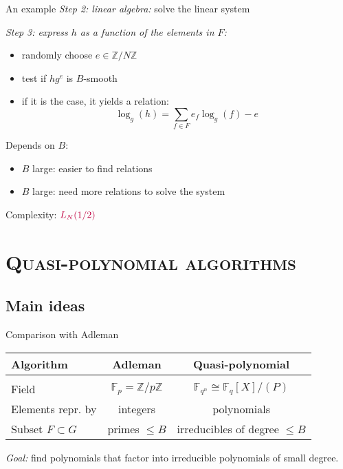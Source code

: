 \documentclass[xcolor=x11names,compress]{beamer}
\theoremstyle{break}
\theoremstyle{sc}
\theoremstyle{definition}
\theoremstyle{remark}
\begin{document}
\begin{frame}{An example}
  \emph{Step 2: linear algebra:} solve the linear system
  
  \emph{Step 3: express $h$ as a function of the elements in $F$:}
  \begin{itemize}
     \item randomly choose $e\in \mathbb{Z}/N\mathbb{Z}$
    \item test if $hg^e$ is $B$-smooth
    \item if it is the case, it yields a relation:
     \[
      \log_g(h) = \sum_{f\in F}e_f\log_g(f) - e
      \]
  \end{itemize}

 Depends on $B$:
  \begin{itemize}
    \item $B$ large: easier to find relations
    \item $B$ large: need more relations to solve the system
  \end{itemize}
  Complexity: $\textcolor{purple}{L_N(1/2)}$

\end{frame}

\section{\scshape Quasi-polynomial algorithms} 
\subsection{Main ideas}
\begin{frame}{Comparison with Adleman}
  \begin{center}
  \begin{tabular}[here]{lcc}
  Algorithm  & Adleman & Quasi-polynomial \\
  \hline
  & & \\
  Field & $\mathbb{F}_p=\mathbb{Z}/p\mathbb{Z}$ & $\mathbb{F}_{q^n}\cong \mathbb{F}_q[X]/(P)$ \\
  Elements repr. by & integers & polynomials \\
  Subset $F\subset G$ & primes $\leq B$ & irreducibles of degree $\leq B$ \\
  \end{tabular}
  \end{center}

  \emph{Goal:} find polynomials that factor into irreducible polynomials of small degree.
\end{frame}
\end{document}
